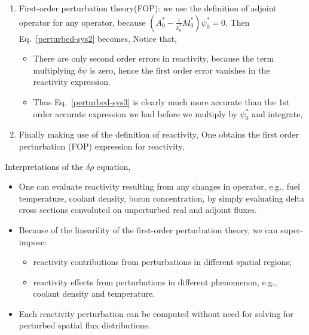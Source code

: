 \documentclass{school-22.211-notes}
\begin{document}
\begin{enumerate}
\item First-order perturbation theory(FOP): we use the definition of adjoint operator for any operator, 
because $\left( A_0^* - \frac{1}{k_0^*} M_0^* \right) \psi_0^* = 0$. Then Eq.~\ref{perturbed-sys2} becomes, 
Notice that, 
\begin{itemize}
 \item There are only second order errors in reactivity, because the term multiplying $\delta \psi$ is zero, hence the first order error vanishes in the reactivity expression. 
 \item Thus Eq.~\ref{perturbed-sys3} is clearly much more accurate than the 1st order accurate expression we had before we multiply by $\psi_0^*$ and integrate,
\end{itemize}

 \item Finally making use of the definition of reactivity, 
   One obtains the first order perturbation (FOP) expression for reactivity, 
\end{enumerate}
Interpretations of the $\delta \rho$ equation, 
\begin{itemize}
\item One can evaluate reactivity resulting from any changes in operator, e.g., fuel temperature, coolant density, boron concentration, by simply evaluating delta cross sections convoluted on unperturbed real and adjoint fluxes. 

\item Because of the linearility of the first-order perturbation theory, we can super-impose: 
  \begin{itemize}
  \item reactivity contributions from perturbations in different spatial regions;
  \item reactivity effects from perturbations in different phenomenon, e.g., coolant density and temperature. 
  \end{itemize}

\item Each reactivity perturbation can be computed without need for solving for perturbed spatial flux distributions. 
\end{itemize}
\end{document}
